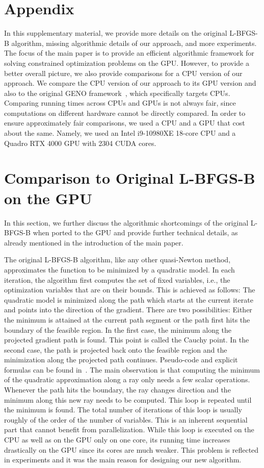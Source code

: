 \documentclass[letterpaper]{article} %
\begin{document}
\appendix
\onecolumn
\newpage
{}
\section{Appendix}
In this supplementary material, we provide more details on the original L-BFGS-B algorithm, missing algorithmic details of our approach, and more experiments. The focus of the main paper is to provide an efficient algorithmic framework for solving constrained optimization problems on the GPU. However, to provide a better overall picture, we also provide comparisons for a CPU version of our approach. We compare the CPU version of our approach to its GPU version and also to the original GENO framework~\cite{LaueMG2019}, which specifically targets CPUs. Comparing running times across CPUs and GPUs is not always fair, since computations on different hardware cannot be directly compared. In order to ensure approximately fair comparisons, we used a CPU and a GPU that cost about the same. Namely, we used an  Intel i9-10980XE 18-core CPU and a Quadro RTX 4000 GPU with 2304 CUDA cores.

\section{Comparison to Original L-BFGS-B on the GPU}

In this section, we further discuss the algorithmic shortcomings of the original L-BFGS-B when ported to the GPU and provide further technical details, as already mentioned in the introduction of the main paper.

The original L-BFGS-B algorithm, like any other quasi-Newton method, approximates the function to be minimized by a quadratic model. In each iteration, the algorithm first computes the set of fixed variables, i.e., the optimization variables that are on their bounds. This is achieved as follows: The quadratic model is minimized along the path which starts at the current iterate and points into the direction of the gradient. There are two possibilities: Either the minimum is attained at the current path segment or the path first hits the boundary of the feasible region. In the first case, the minimum along the projected gradient path is found. This point is called the Cauchy point. In the second case, the path is projected back onto the feasible region and the minimization along the projected path continues. Pseudo-code and explicit formulas can be found in~\cite{ByrdLNZ95}. The main observation is that computing the minimum of the quadratic approximation along a ray only needs a few scalar operations. Whenever the path hits the boundary, the ray changes direction and the minimum along this new ray needs to be computed. This loop is repeated until the minimum is found. The total number of iterations of this loop is usually roughly of the order of the number of variables. This is an inherent sequential part that cannot benefit from parallelization. While this loop is executed on the CPU as well as on the GPU only on one core, its running time increases drastically on the GPU since its cores are much weaker. This problem is reflected in experiments and it was the main reason for designing our new algorithm. 
\end{document}
